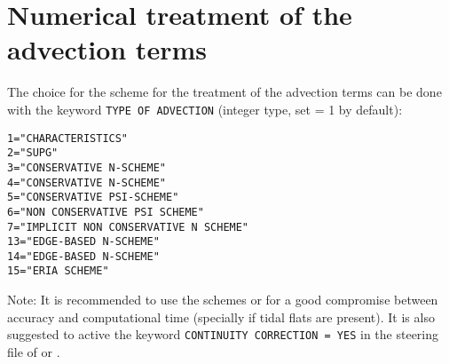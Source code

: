 \section{Numerical treatment of the advection terms}
The choice for the scheme for the treatment of the advection terms can be done with the keyword \texttt{TYPE OF ADVECTION} (integer type, set {\ttfamily = 1} by default):
\begin{lstlisting}[frame=trBL]  
1="CHARACTERISTICS" 
2="SUPG" 
3="CONSERVATIVE N-SCHEME"
4="CONSERVATIVE N-SCHEME"
5="CONSERVATIVE PSI-SCHEME"
6="NON CONSERVATIVE PSI SCHEME"
7="IMPLICIT NON CONSERVATIVE N SCHEME"
13="EDGE-BASED N-SCHEME"
14="EDGE-BASED N-SCHEME"
15="ERIA SCHEME"
\end{lstlisting}

\begin{WarningBlock}{Note:}
  It is recommended to use the schemes {} or {} for a good compromise between accuracy and computational time (specially if tidal flats are present). It is also suggested to active
  the keyword \texttt{CONTINUITY CORRECTION = YES} in the steering file of  or .
\end{WarningBlock}

